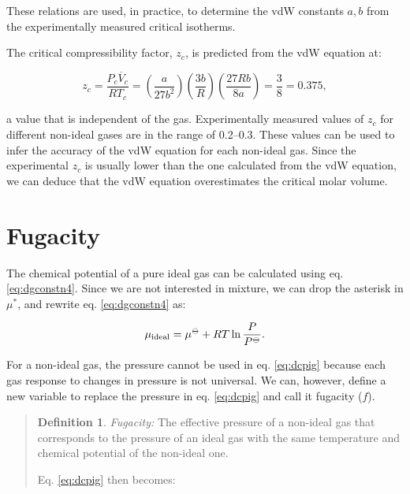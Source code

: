 \documentclass[
  9pt,
]{extbook}
\theoremstyle{definition}
\newtheorem{definition}{Definition}[chapter]
\theoremstyle{definition}
\theoremstyle{definition}
\theoremstyle{remark}
\begin{document}
These relations are used, in practice, to determine the vdW constants \(a,b\) from the experimentally measured critical isotherms.

The critical compressibility factor, \(z_c\), is predicted from the vdW equation at:

\begin{equation}
z_c=\frac{P_c \overline{V}_c}{R T_c}=\left( \frac{a}{27b^2} \right) \left( \frac{3b}{R} \right) \left( \frac{27Rb}{8a} \right) = \frac{3}{8} = 0.375,
\label{eq:critiz}
\end{equation}

a value that is independent of the gas. Experimentally measured values of \(z_c\) for different non-ideal gases are in the range of 0.2--0.3. These values can be used to infer the accuracy of the vdW equation for each non-ideal gas. Since the experimental \(z_c\) is usually lower than the one calculated from the vdW equation, we can deduce that the vdW equation overestimates the critical molar volume.

\hypertarget{fugacity}{%
\section{Fugacity}\label{fugacity}}

The chemical potential of a pure ideal gas can be calculated using eq. \eqref{eq:dgconstn4}. Since we are not interested in mixture, we can drop the asterisk in \(\mu^*\), and rewrite eq. \eqref{eq:dgconstn4} as:

\begin{equation}
\mu_{\text{ideal}} = \mu^{-\kern-6pt{\ominus}\kern-6pt-}+ RT \ln \frac{P}{P^{-\kern-6pt{\ominus}\kern-6pt-}}.
\label{eq:dcpig}
\end{equation}

For a non-ideal gas, the pressure cannot be used in eq. \eqref{eq:dcpig} because each gas response to changes in pressure is not universal. We can, however, define a new variable to replace the pressure in eq. \eqref{eq:dcpig} and call it fugacity (\(f\)).

\begin{quote}
\begin{definition}
\protect\hypertarget{def:fugacitydef}{}{\label{def:fugacitydef} }\emph{Fugacity:} The effective pressure of a non-ideal gas that corresponds to the pressure of an ideal gas with the same temperature and chemical potential of the non-ideal one.
\end{definition}

Eq. \eqref{eq:dcpig} then becomes:
\end{quote}
\end{document}
